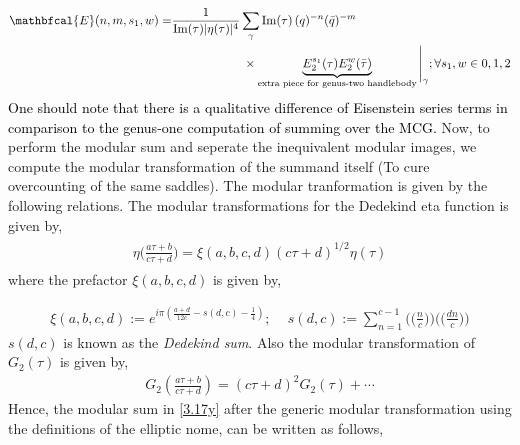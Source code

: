 \documentclass[12 pt]{article}
\begin{document}
\begin{align}
\begin{split}
     \mathbfcal{E}
  (n,m,s_1,w)=&\frac{1}{\Im(\tau)|\eta(\tau)|^4}\sum_{\gamma}{\Im(\tau)} \,(q)^{-n} (\bar q)^{-m}\\&\,\hspace{2 cm}\times\underbrace{E_2^{s_1}(\tau)E_{2}^w(\bar\tau)}_{\text{extra piece for genus-two handlebody}}\Bigg|_{\gamma};\forall s_1,w\in 0,1,2\label{3.17y}
  \end{split}
\end{align}
\noindent
\textcolor{black}{One should note that there is a qualitative difference of Eisenstein series terms in comparison to the genus-one computation of summing over the MCG.} Now, to perform the modular sum and seperate the inequivalent modular images, we compute the modular transformation of the summand itself (To cure overcounting of the same saddles). The modular tranformation is given by the following relations. The modular transformations for the Dedekind eta function is given by,
\begin{align}
    \begin{split}
        \eta\Bigg(\frac{a\tau+b}{c\tau+d}\Bigg)=\xi(a,b,c,d)(c\tau+d)^{1/2}\eta(\tau)
    \end{split}
\end{align}
 where the prefactor $\xi(a,b,c,d)$ is given by,

\begin{align}
    \xi(a,b,c,d):=e^{i\pi(\frac{a+d}{12c}-s(d,c)-\frac{1}{4})};\,\,\,\,\,\,\, s(d,c):=\sum_{n=1}^{c-1}\Bigg(\Bigg(\frac{n}{c}\Bigg)\Bigg)\Bigg(\Bigg(\frac{dn}{c}\Bigg)\Bigg)
\end{align}
$s(d,c)$ is known as the \textit{Dedekind sum}. Also the modular transformation of $G_2(\tau)$ is given by,
\begin{align}
    G_{2}\left(\frac{a\tau+b}{c\tau+d}\right)=(c\tau+d)^2G_{2}(\tau)+\cdots
\end{align}
Hence, the modular sum in \eqref{3.17y}  after the  generic modular transformation using the definitions of the elliptic nome, can be written as follows,

\end{document}
